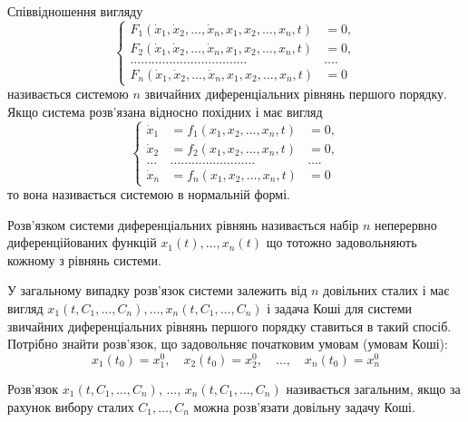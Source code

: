 Співвідношення вигляду
\begin{equation*}
	\left\{
		\begin{aligned}
			F_1(\dot x_1, \dot x_2, \ldots, \dot x_n, x_1, x_2, \ldots, x_n, t) &= 0, \\
			F_2(\dot x_1, \dot x_2, \ldots, \dot x_n, x_1, x_2, \ldots, x_n, t) &= 0, \\
			\ldots \ldots \ldots \ldots \ldots \ldots \ldots \ldots \ldots \ldots \ldots & \ldots . \\
			F_n(\dot x_1, \dot x_2, \ldots, \dot x_n, x_1, x_2, \ldots, x_n, t) &= 0
		\end{aligned}
	\right.
\end{equation*}
називається системою $n$ звичайних диференціальних рівнянь першого порядку. \\

Якщо система розв'язана відносно похідних і має вигляд
\begin{equation*}
	\left\{
		\begin{aligned}
			\dot x_1 &= f_1(x_1, x_2, \ldots, x_n, t) &= 0, \\
			\dot x_2 &= f_2(x_1, x_2, \ldots, x_n, t) &= 0, \\
			\ldots & \ldots \ldots \ldots \ldots \ldots \ldots \ldots \ldots &\ldots . \\
			\dot x_n &= f_n(x_1, x_2, \ldots, x_n, t) &= 0
		\end{aligned}
	\right.
\end{equation*}
то вона називається системою в нормальній формі.

\begin{definition}
	Розв'язком системи диференціальних рівнянь на\-зи\-ва\-є\-ть\-ся набір $n$ неперервно диференційованих функцій $x_1(t), \ldots, x_n(t)$ що тотожно задовольняють кожному з рівнянь системи.
\end{definition}

У загальному випадку розв'язок системи залежить від $n$ довільних сталих і має вигляд  $x_1(t, C_1, \ldots, C_n), \ldots, x_n(t, C_1, \ldots, C_n)$ і задача Коші для системи звичайних диференціальних рівнянь першого порядку ставиться в такий спосіб. Потрібно знайти розв'язок, що задовольняє початковим умовам (умовам Коші):
\begin{equation*}
	x_1(t_0) = x_1^0, \quad x_2(t_0) = x_2^0, \quad \ldots, \quad x_n(t_0) = x_n^0
\end{equation*}

\begin{definition}
	Розв'язок $x_1(t, C_1, \ldots, C_n)$, $\ldots$, $x_n(t, C_1, \ldots, C_n)$ на\-зи\-ва\-є\-ть\-ся загальним, якщо за рахунок вибору сталих $C_1, \ldots, C_n$ можна роз\-в'яз\-а\-ти довільну задачу Коші.
\end{definition}

